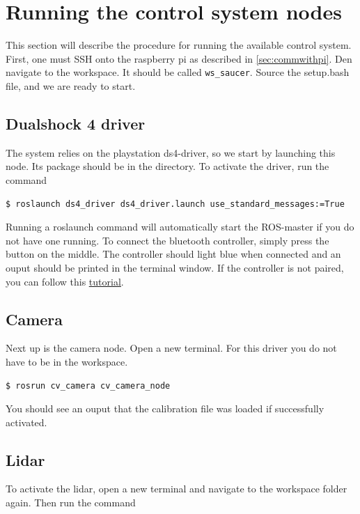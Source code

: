 \section{Running the control system nodes}

This section will describe the procedure for running the available control system. First, one must SSH onto the raspberry pi as described in \cref{sec:commwithpi}. Den navigate to the workspace. It should be called \texttt{ws\_saucer}. Source the setup.bash file, and we are ready to start. 

\subsection{Dualshock 4 driver}
 
The system relies on the playstation ds4-driver, so we start by launching this node. Its package should be in the directory. To activate the driver, run the command

\begin{lstlisting}[language=bash]
$ roslaunch ds4_driver ds4_driver.launch use_standard_messages:=True
\end{lstlisting}

Running a roslaunch command will automatically start the ROS-master if you do not have one running. To connect the bluetooth controller, simply press the button on the middle. The controller should light blue when connected and an ouput should be printed in the terminal window. If the controller is not paired, you can follow this \underline{\href{https://ubuntu.com/core/docs/bluez/reference/pairing/outbound-pairing}{tutorial}}.


\subsection{Camera}
\label{sec:camera-driver}
Next up is the camera node. Open a new terminal. For this driver you do not have to be in the workspace. 

\begin{lstlisting}[language=bash]
$ rosrun cv_camera cv_camera_node
\end{lstlisting}

You should see an ouput that the calibration file was loaded if successfully activated. 

\subsection{Lidar}
\label{sec:lidar-driver}
To activate the lidar, open a new terminal and navigate to the workspace folder again. Then run the command

